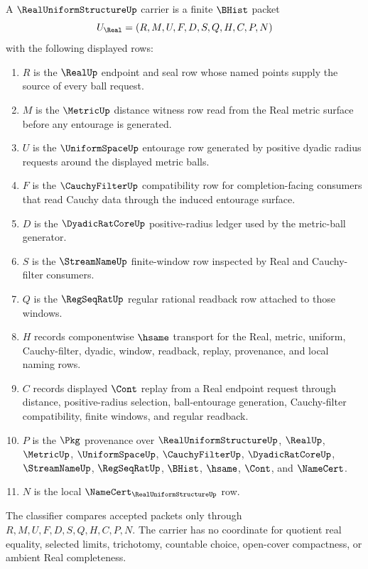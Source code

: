 \begin{definition}
\label{def:real-uniform-structure-carrier}
A $\RealUniformStructureUp$ carrier is a finite $\BHist$ packet
$$
U_{\Real}=(R,M,U,F,D,S,Q,H,C,P,N)
$$
with the following displayed rows:
\begin{enumerate}
\item $R$ is the $\RealUp$ endpoint and seal row whose named points supply the source of every ball request.
\item $M$ is the $\MetricUp$ distance witness row read from the Real metric surface before any entourage is generated.
\item $U$ is the $\UniformSpaceUp$ entourage row generated by positive dyadic radius requests around the displayed metric balls.
\item $F$ is the $\CauchyFilterUp$ compatibility row for completion-facing consumers that read Cauchy data through the induced entourage surface.
\item $D$ is the $\DyadicRatCoreUp$ positive-radius ledger used by the metric-ball generator.
\item $S$ is the $\StreamNameUp$ finite-window row inspected by Real and Cauchy-filter consumers.
\item $Q$ is the $\RegSeqRatUp$ regular rational readback row attached to those windows.
\item $H$ records componentwise $\hsame$ transport for the Real, metric, uniform, Cauchy-filter, dyadic, window, readback, replay, provenance, and local naming rows.
\item $C$ records displayed $\Cont$ replay from a Real endpoint request through distance, positive-radius selection, ball-entourage generation, Cauchy-filter compatibility, finite windows, and regular readback.
\item $P$ is the $\Pkg$ provenance over $\RealUniformStructureUp$, $\RealUp$, $\MetricUp$, $\UniformSpaceUp$, $\CauchyFilterUp$, $\DyadicRatCoreUp$, $\StreamNameUp$, $\RegSeqRatUp$, $\BHist$, $\hsame$, $\Cont$, and $\NameCert$.
\item $N$ is the local $\NameCert_{\RealUniformStructureUp}$ row.
\end{enumerate}
The classifier compares accepted packets only through $R,M,U,F,D,S,Q,H,C,P,N$. The carrier has no coordinate for quotient real equality, selected limits, trichotomy, countable choice, open-cover compactness, or ambient Real completeness.
\end{definition}

